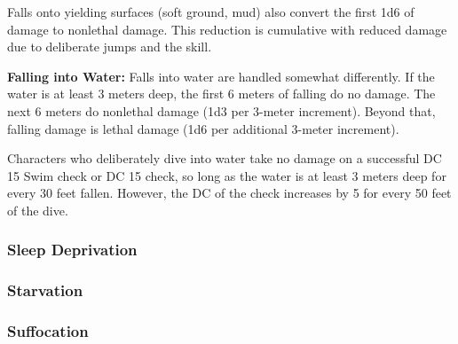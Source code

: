 Falls onto yielding surfaces (soft ground, mud) also convert the first 1d6 of damage to nonlethal damage. This reduction is cumulative with reduced damage due to deliberate jumps and the  skill.

\textbf{Falling into Water:} Falls into water are handled somewhat differently. If the water is at least 3 meters deep, the first 6 meters of falling do no damage. The next 6 meters do nonlethal damage (1d3 per 3-meter increment). Beyond that, falling damage is lethal damage (1d6 per additional 3-meter increment).

Characters who deliberately dive into water take no damage on a successful DC 15 Swim check or DC 15  check, so long as the water is at least 3 meters deep for every 30 feet fallen. However, the DC of the check increases by 5 for every 50 feet of the dive.
\subsubsection{Sleep Deprivation}
\subsubsection{Starvation}
\subsubsection{Suffocation}
